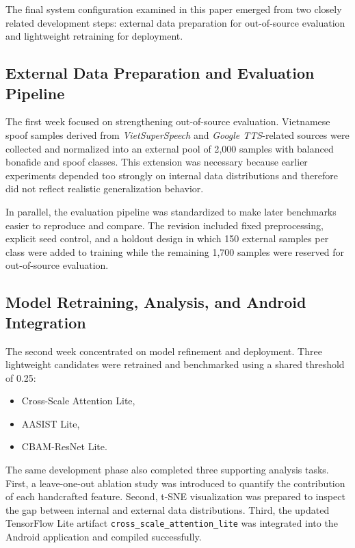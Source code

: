 \documentclass[pdflatex,sn-mathphys-num]{sn-jnl}
\begin{document}
The final system configuration examined in this paper emerged from two closely related development steps: external data preparation for out-of-source evaluation and lightweight retraining for deployment.

\subsection{External Data Preparation and Evaluation Pipeline}

The first week focused on strengthening out-of-source evaluation. Vietnamese spoof samples derived from \textit{VietSuperSpeech} and \textit{Google TTS}-related sources were collected and normalized into an external pool of 2{,}000 samples with balanced bonafide and spoof classes. This extension was necessary because earlier experiments depended too strongly on internal data distributions and therefore did not reflect realistic generalization behavior.

In parallel, the evaluation pipeline was standardized to make later benchmarks easier to reproduce and compare. The revision included fixed preprocessing, explicit seed control, and a holdout design in which 150 external samples per class were added to training while the remaining 1{,}700 samples were reserved for out-of-source evaluation.

\subsection{Model Retraining, Analysis, and Android Integration}

The second week concentrated on model refinement and deployment. Three lightweight candidates were retrained and benchmarked using a shared threshold of 0.25:

\begin{itemize}[leftmargin=*]
\item Cross-Scale Attention Lite,
\item AASIST Lite,
\item CBAM-ResNet Lite.
\end{itemize}

The same development phase also completed three supporting analysis tasks. First, a leave-one-out ablation study was introduced to quantify the contribution of each handcrafted feature. Second, t-SNE visualization was prepared to inspect the gap between internal and external data distributions. Third, the updated TensorFlow Lite artifact \texttt{cross\_scale\_attention\_lite} was integrated into the Android application and compiled successfully.
\end{document}
